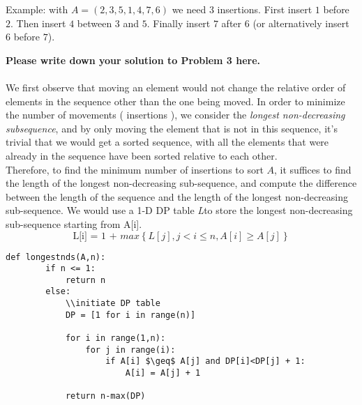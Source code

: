 \documentclass[11pt,twoside]{article}
\newenvironment{solution}{{\par\noindent\it Solution.}}{}
\begin{document}
Example: with $A=(2,3,5,1,4,7,6)$ we need $3$ insertions. First insert $1$ before $2$. Then insert $4$ between $3$ and $5$. Finally insert $7$ after $6$ (or alternatively insert $6$ before $7$).

\begin{solution}
\textbf{Please write down your solution to Problem 3 here.}\\\\
We first observe that moving an element would not change the relative order of elements in the sequence other than the one being moved. In order to minimize the number of movements ( insertions ), we consider the \textit{longest non-decreasing subsequence}, and by only moving the element that is not in this sequence, it's trivial that we would get a sorted sequence, with all the elements that were already in the sequence have been sorted relative to each other. \\
Therefore, to find the minimum number of insertions to sort $A$, it suffices to find the length of the longest non-decreasing sub-sequence, and compute the difference between the length of the sequence and the length of the longest non-decreasing sub-sequence. We would use a 1-D DP table \textit{L}to store the longest non-decreasing sub-sequence starting from A[i]. $$\text{L[i] = 1 +  $max\left\{L[j],j<i \leq n, A[i]\geq A[j] \right\}$}$$
\begin{lstlisting}[mathescape]
    def longestnds(A,n):
        if n <= 1:
            return n
        else:
            \\initiate DP table
            DP = [1 for i in range(n)]
            
            for i in range(1,n):
                for j in range(i):
                    if A[i] $\geq$ A[j] and DP[i]<DP[j] + 1:
                        A[i] = A[j] + 1
            
            return n-max(DP)
                
\end{lstlisting}
\end{solution}
\end{document}
